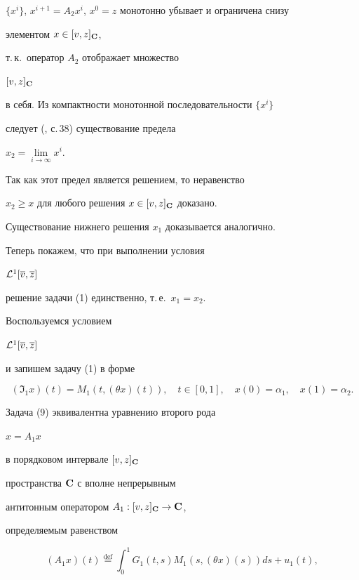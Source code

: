 \begin{pf}
$\{x^i\}$, $x^{i+1}=A_2x^i$, $x^0=z$ монотонно убывает и ограничена снизу


элементом $x\in [v,z]_{\bold C}$,


т.\,к.~оператор $A_2$ отображает множество


$[v,z]_{\bold C}$


в себя. Из компактности монотонной последовательности $\{x^i\}$


следует (\cite{5}, с.\,38) существование предела


$x_2=\lim\limits_{i\to\infty}x^i$.


Так как этот предел является решением, то неравенство


$x_2\ge x$ для любого решения $x\in [v,z]_{\bold C}$ доказано.


Существование нижнего решения $x_1$ доказывается аналогично.





Теперь покажем, что при выполнении условия


${\cal L}^1[\overline {v},\overline {z}]$


решение задачи (1) единственно, т.\,е.~$x_1=x_2$.


Воспользуемся условием


${\cal L}^1[\overline {v},\overline {z}]$


и запишем задачу (1) в форме


\begin{equation}


({\Im}_1x)(t)=


M_1(t,(\theta x)(t)),\quad


t\in[0,1],\quad x(0)=\alpha_1, \quad x(1)=\alpha_2.


\end{equation}


Задача (9) эквивалентна уравнению второго рода


$x=A_1x$


в порядковом интервале $[v,z]_{\bold C}$


пространства $\bold C$ с вполне непрерывным


антитонным оператором $A_1:[v,z]_{\bold C}\to\bold C$,


определяемым равенством


$$


(A_1x)(t) \overset{\mathrm{def}}{=}{}


\int_0^1G_1(t,s)M_1(s,(\theta x)(s))ds+u_1(t),


$$



\end{pf}
